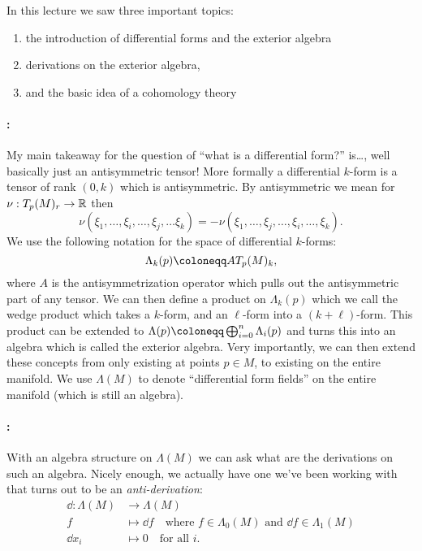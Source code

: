 \documentclass{homework}
\begin{document}
In this lecture we saw three important topics:
\begin{enumerate}
	\item the introduction of differential forms and the exterior algebra\label{it:forms}
	\item derivations on the exterior algebra,\label{it:derivation}
	\item and the basic idea of a cohomology theory\label{it:cohomology}
\end{enumerate}

\paragraph{:}
My main takeaway for the question of ``what is a differential form?'' is\dots, well basically just an antisymmetric tensor!
More formally a differential $k$-form is a tensor of rank $(0, k)$ which is antisymmetric.
By antisymmetric we mean for $\nu: T_p(M)_r\to \mathbb{R}$ then
\begin{equation*}
	\nu(\xi_1, \ldots, \xi_i, \ldots, \xi_j, \ldots \xi_k) = - \nu(\xi_1, \ldots, \xi_j,\ldots, \xi_i, \ldots, \xi_k).
\end{equation*}
We use the following notation for the space of differential $k$-forms:
\begin{equation*}
	\Lambda_k(p) \defeq AT_p(M)_k,
\end{equation*}
where $A$ is the antisymmetrization operator which pulls out the antisymmetric part of any tensor.
We can then define a product on $\Lambda_k(p)$ which we call the wedge product which takes a $k$-form, and an $\ell$-form into a $(k + \ell)$-form.
This product can be extended to $\Lambda(p) \defeq \bigoplus_{i = 0}^n \Lambda_i(p)$ and turns this into an algebra which is called the exterior algebra.
Very importantly, we can then extend these concepts from only existing at points $p\in M$, to existing on the entire manifold.
We use $\Lambda(M)$ to denote ``differential form fields'' on the entire manifold (which is still an algebra).

\paragraph{:}
With an algebra structure on $\Lambda(M)$ we can ask what are the derivations on such an algebra.
Nicely enough, we actually have one we've been working with that turns out to be an \emph{anti-derivation}:
\begin{align*}
	\dd{} : \Lambda(M) & \longrightarrow \Lambda(M)                                                            \\
	f                  & \longmapsto \dd{f}\quad\text{where }f\in\Lambda_0(M)\text{ and }\dd{f}\in\Lambda_1(M) \\
	\dd{x_i}           & \longmapsto 0\quad\text{for all }i.
\end{align*}
\end{document}
